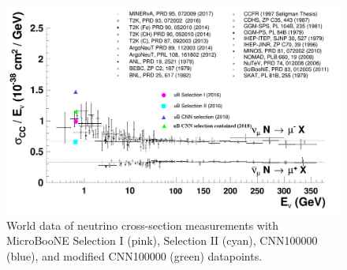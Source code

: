 \begin{figure}[htp!]
\centering
\includegraphics[width=.8\textwidth]{figs/c_data_PDB_02_contained.png}
\caption{World data of neutrino cross-section measurements with MicroBooNE Selection I (pink), Selection II (cyan), CNN100000 (blue), and modified CNN100000 (green) datapoints.}
\label{fig:xsec}
\end{figure}
